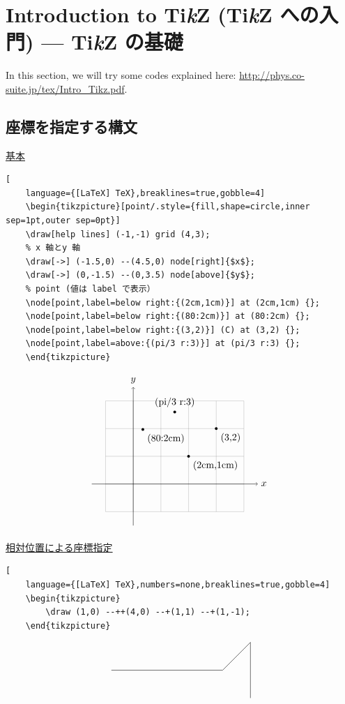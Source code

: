 \documentclass[../geometrymemo.tex]{subfiles}
\begin{document}
\section{Introduction to Ti\textit{k}Z (Ti\textit{k}Z への入門) --- Ti\textit{k}Z の基礎}
\label{sec:introtikz}

In this section, we will try some codes explained here: \url{http://phys.co-suite.jp/tex/Intro_Tikz.pdf}.

\subsection{座標を指定する構文}

\underline{基本}

\begin{lstlisting}[
    language={[LaTeX] TeX},breaklines=true,gobble=4]
    \begin{tikzpicture}[point/.style={fill,shape=circle,inner sep=1pt,outer sep=0pt}]
    \draw[help lines] (-1,-1) grid (4,3);
    % x 軸とy 軸
    \draw[->] (-1.5,0) --(4.5,0) node[right]{$x$};
    \draw[->] (0,-1.5) --(0,3.5) node[above]{$y$};
    % point (値は label で表示）
    \node[point,label=below right:{(2cm,1cm)}] at (2cm,1cm) {};
    \node[point,label=below right:{(80:2cm)}] at (80:2cm) {};
    \node[point,label=below right:{(3,2)}] (C) at (3,2) {};
    \node[point,label=above:{(pi/3 r:3)}] at (pi/3 r:3) {};
    \end{tikzpicture}
\end{lstlisting}
\[
    \begin{tikzpicture}[point/.style={fill,shape=circle,inner sep=1pt,outer sep=0pt}]
    \draw[help lines] (-1,-1) grid (4,3);
    \draw[->] (-1.5,0) --(4.5,0) node[right]{$x$};
    \draw[->] (0,-1.5) --(0,3.5) node[above]{$y$};
    \node[point,label=below right:{(2cm,1cm)}] at (2cm,1cm) {};
    \node[point,label=below right:{(80:2cm)}] at (80:2cm) {};
    \node[point,label=below right:{(3,2)}] (C) at (3,2) {};
    \node[point,label=above:{(pi/3 r:3)}] at (pi/3 r:3) {};
    \end{tikzpicture}
\]

\underline{相対位置による座標指定}

\begin{lstlisting}[
    language={[LaTeX] TeX},numbers=none,breaklines=true,gobble=4]
    \begin{tikzpicture}
        \draw (1,0) --++(4,0) --+(1,1) --+(1,-1);
    \end{tikzpicture}
\end{lstlisting}
\[
    \begin{tikzpicture}
        \draw (1,0) --++(4,0) --+(1,1) --+(1,-1);
    \end{tikzpicture}
\]
\end{document}
